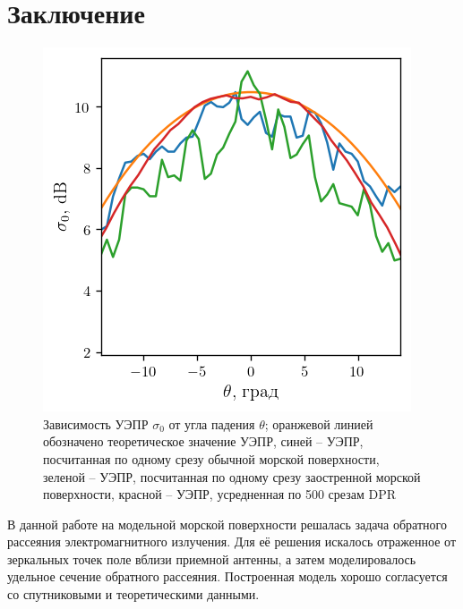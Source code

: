 
\newpage
\section*{Заключение}

\begin{figure}
    \centering
    \includegraphics[width=0.6\linewidth]{figs/crosssec.png}
    \caption{Зависимость УЭПР $\sigma_0$ от угла падения  $\theta$; 
    оранжевой линией обозначено теоретическое значение УЭПР,
    синей -- УЭПР, посчитанная по одному срезу обычной морской поверхности,
    зеленой -- УЭПР, посчитанная по одному срезу заостренной морской поверхности,
    красной -- УЭПР, усредненная по 500 срезам DPR}
    \label{fig:crosssec}
\end{figure}

В данной работе на модельной морской поверхности решалась задача
обратного рассеяния электромагнитного излучения.  Для её решения 
искалось отраженное от зеркальных точек поле вблизи приемной антенны, а затем
моделировалось удельное сечение обратного рассеяния. Построенная модель хорошо
согласуется со спутниковыми и теоретическими данными.





